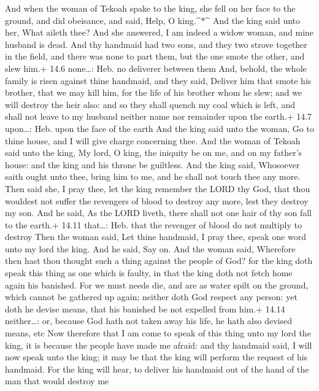  And when the woman of Tekoah spake to the king, she fell on
her face to the ground, and did obeisance, and said, Help, O
king.\^{}*\^{}  And the king said unto her, What aileth
thee? And she answered, I am indeed a widow woman, and mine husband is
dead.  And thy handmaid had two sons, and they two strove
together in the field, and there was none to part them, but the one
smote the other, and slew him.+ 14.6 none\ldots: Heb. no deliverer
between them  And, behold, the whole family is risen against
thine handmaid, and they said, Deliver him that smote his brother, that
we may kill him, for the life of his brother whom he slew; and we will
destroy the heir also: and so they shall quench my coal which is left,
and shall not leave to my husband neither name nor remainder upon the
earth.+ 14.7 upon\ldots: Heb. upon the face of the earth 
And the king said unto the woman, Go to thine house, and I will give
charge concerning thee.  And the woman of Tekoah said unto
the king, My lord, O king, the iniquity be on me, and on my father's
house: and the king and his throne be guiltless.  And the
king said, Whosoever saith ought unto thee, bring him to me, and he
shall not touch thee any more.  Then said she, I pray thee,
let the king remember the LORD thy God, that thou wouldest not suffer
the revengers of blood to destroy any more, lest they destroy my son.
And he said, As the LORD liveth, there shall not one hair of thy son
fall to the earth.+ 14.11 that\ldots: Heb. that the revenger of blood do
not multiply to destroy  Then the woman said, Let thine
handmaid, I pray thee, speak one word unto my lord the king. And he
said, Say on.  And the woman said, Wherefore then hast thou
thought such a thing against the people of God? for the king doth speak
this thing as one which is faulty, in that the king doth not fetch home
again his banished.  For we must needs die, and are as
water spilt on the ground, which cannot be gathered up again; neither
doth God respect any person: yet doth he devise means, that his banished
be not expelled from him.+ 14.14 neither\ldots: or, because God hath not
taken away his life, he hath also devised means, etc  Now
therefore that I am come to speak of this thing unto my lord the king,
it is because the people have made me afraid: and thy handmaid said, I
will now speak unto the king; it may be that the king will perform the
request of his handmaid.  For the king will hear, to
deliver his handmaid out of the hand of the man that would destroy me
